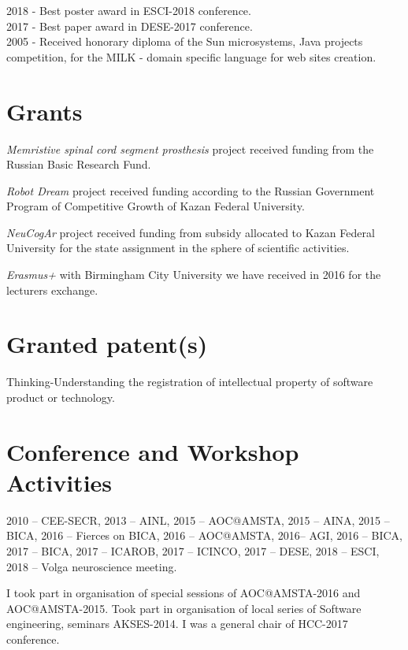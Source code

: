 \documentclass{moderncv}
\begin{document}
2018 - Best poster award in ESCI-2018 conference.\\
2017 - Best paper award in DESE-2017 conference.\\
2005 - Received honorary diploma of the Sun microsystems, Java projects competition, for the MILK - domain specific language for web sites creation.\\

\section{Grants}

\emph{Memristive spinal cord segment prosthesis} project received funding from the Russian Basic Research Fund.

\emph{Robot Dream} project received funding according to the Russian Government Program of Competitive Growth of Kazan Federal University.

\emph{NeuCogAr} project received funding from subsidy allocated to Kazan Federal University for the state assignment in the sphere of scientific activities.

\emph{Erasmus+} with Birmingham City University we have received in 2016 for the lecturers exchange. 

\section{Granted patent(s)}

Thinking-Understanding the registration of intellectual property of software product or technology.

 
\nocite{*}
\printbibliography[title={Papers}]

\cvitem{}{}

\section{Conference and Workshop Activities}

2010 -- CEE-SECR, 2013 -- AINL, 2015 -- AOC@AMSTA, 2015 -- AINA, 2015 -- BICA, 2016 -- Fierces on BICA, 2016 -- AOC@AMSTA, 2016-- AGI, 2016 -- BICA, 2017 -- BICA, 2017 -- ICAROB, 2017 -- ICINCO, 2017 -- DESE, 2018 -- ESCI, 2018 -- Volga neuroscience meeting.

I took part in organisation of special sessions of AOC@AMSTA-2016 and AOC@AMSTA-2015. Took part in organisation of local series of Software engineering, seminars AKSES-2014. I was a general chair of HCC-2017 conference.
\end{document}

